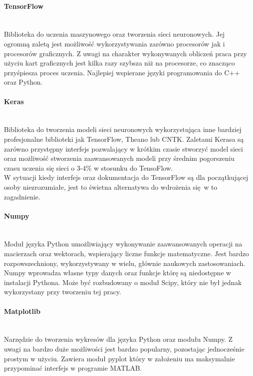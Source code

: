 \paragraph{TensorFlow} \mbox{}\\
Biblioteka do uczenia maszynowego oraz tworzenia sieci neuronowych. Jej ogromną
zaletą jest możliwość wykorzystywania zarówno procesorów jak i procesorów graficznych.
Z uwagi na charakter wykonywanych obliczeń praca przy użyciu kart graficznych
jest kilka razy szybsza niż na procesorze, co znacząco przyśpiesza proces uczenia.
Najlepiej wspierane języki programowania do C++ oraz Python.

\paragraph{Keras} \mbox{}\\
Biblioteka do tworzenia modeli sieci neuronowych wykorzystująca inne bardziej
profesjonalne biblioteki jak TensorFlow, Theano lub CNTK. Zaletami Kerasa są
zarówno przystępny interfejs pozwalający w krótkim czasie stworzyć model sieci
oraz możliwość stworzenia zaawansowanych modeli przy średnim pogorszeniu czasu
uczenia się sieci o 3-4\% w stosunku do TensoFlow. \\W sytuacji kiedy interfejs
oraz dokumentacja do TensorFlow są dla początkującej osoby niezrozumiałe, jest
to świetna alternatywa do wdrożenia się w to zagadnienie.

\paragraph{Numpy} \mbox{}\\
Moduł języka Python umożliwiający wykonywanie zaawansowanych operacji na macierzach
oraz wektorach, wspierający liczne funkcje matematyczne. Jest bardzo rozpowszechniony,
wykorzystywany w wielu, głównie naukowych zastosowaniach. Numpy wprowadza własne
typy danych oraz funkcje którę są niedostępne w instalacji Pythona. Może być
rozbudowany o moduł Scipy, który nie był jednak wykorzystany przy tworzeniu tej pracy.

\paragraph{Matplotlib} \mbox{}\\
Narzędzie do tworzenia wykresów dla języka Python oraz modułu Numpy. Z uwagi na
bardzo duże możliwości jest bardzo popularny, pozostając jednocześnie prostym w
użyciu. Zawiera moduł pyplot który w założeniu ma maksymalnie przypominać interfejs
w programie MATLAB.


